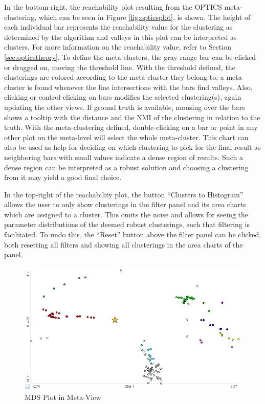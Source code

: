 \documentclass[
	a4paper,
	english,
	twoside,
	openright,               
	11pt                            
	]{report}
\begin{document}
In the bottom-right, the reachability plot resulting from the OPTICS meta-clustering, which can be seen in Figure \ref{fig:opticsplot}, is shown. The height of each individual bar represents the reachability value for the clustering as determined by the algorithm and valleys in this plot can be interpreted as clusters. For more information on the reachability value, refer to Section \ref{sec:opticstheory}. To define the meta-clusters, the gray range bar can be clicked or dragged on, moving the threshold line. With the threshold defined, the clusterings are colored according to the meta-cluster they belong to; a meta-cluster is found whenever the line intersections with the bars find valleys. Also, clicking or control-clicking on bars modifies the selected clustering(s), again updating the other views. If ground truth is available, mousing over the bars shows a tooltip with the distance and the NMI of the clustering in relation to the truth. With the meta-clustering defined, double-clicking on a bar or point in any other plot on the meta-level will select the whole meta-cluster. This chart can also be used as help for deciding on which clustering to pick for the final result as neighboring bars with small values indicate a dense region of results. Such a dense region can be interpreted as a robust solution and choosing a clustering from it may yield a good final choice. 

In the top-right of the reachability plot, the button ``Clusters to Histogram'' allows the user to only show clusterings in the filter panel and its area charts which are assigned to a cluster. This omits the noise and allows for seeing the parameter distributions of the deemed robust clusterings, such that filtering is facilitated. To undo this, the ``Reset'' button above the filter panel can be clicked, both resetting all filters and showing all clusterings in the area charts of the panel.

\begin{figure}[h]
	\centering
	\includegraphics[scale=.45]{mds-plot}
	\caption{MDS Plot in Meta-View}
	\label{fig:mdsplot}
\end{figure}
\end{document}
